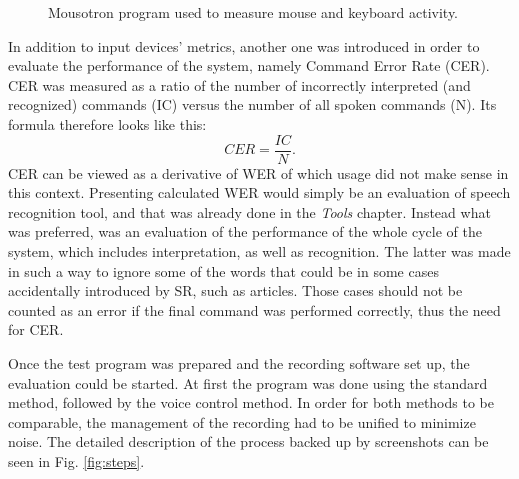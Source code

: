\begin{figure}
    \centering
    \caption{Mousotron program used to measure mouse and keyboard activity.}
    \label{fig:mousotron}
\end{figure}

In addition to input devices' metrics, another one was introduced in order to evaluate the performance of the system, namely Command Error Rate (CER). CER was measured as a ratio of the number of incorrectly interpreted (and recognized) commands (IC) versus the number of all spoken commands (N). Its formula therefore looks like this:
 $$   CER = \frac{IC}{N}. $$
 CER can be viewed as a derivative of WER of which usage did not make sense in this context. Presenting calculated WER would simply be an evaluation of speech recognition tool, and that was already done in the \textit{Tools} chapter. Instead what was preferred, was an evaluation of the performance of the whole cycle of the system, which includes interpretation, as well as recognition. The latter was made in such a way to ignore some of the words that could be in some cases accidentally introduced by SR, such as articles. Those cases should not be counted as an error if the final command was performed correctly, thus the need for CER. 
 
Once the test program was prepared and the recording software set up, the evaluation could be started. At first the program was done using the standard method, followed by the voice control method. In order for both methods to be comparable, the management of the recording had to be unified to minimize noise. The detailed description of the process backed up by screenshots can be seen in Fig. \ref{fig:steps}.
 
